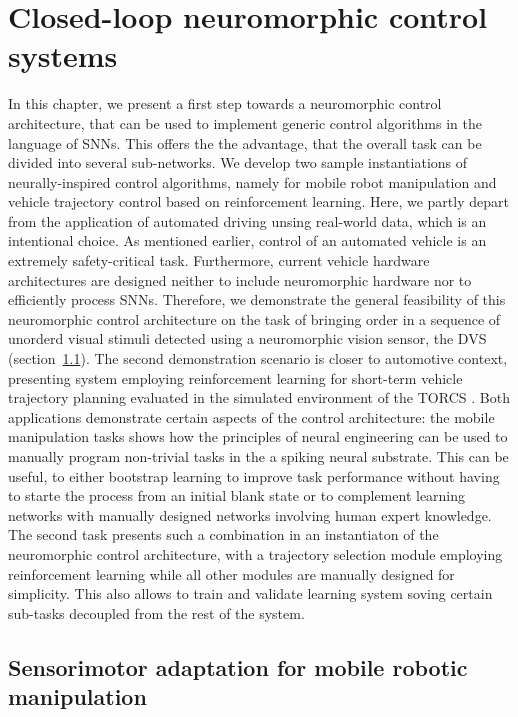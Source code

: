 \chapter{Closed-loop neuromorphic control systems}%
\label{chap:closed_loop_neuromorphic_control_systems}
In this chapter, we present a first step towards a neuromorphic control architecture, that can be used to implement generic control algorithms in the language of \acp{SNN}.
This offers the the advantage, that the overall task can be divided into several sub-networks.
We develop two sample instantiations of neurally-inspired control algorithms, namely for mobile robot manipulation and vehicle trajectory control based on reinforcement learning.
Here, we partly depart from the application of automated driving unsing real-world data, which is an intentional choice.
As mentioned earlier, control of an automated vehicle is an extremely safety-critical task.
Furthermore, current vehicle hardware architectures are designed neither to include neuromorphic hardware nor to efficiently process \acp{SNN}.
Therefore, we demonstrate the general feasibility of this neuromorphic control architecture on the task of bringing order in a sequence of unorderd visual stimuli detected using a neuromorphic vision sensor, the \ac{DVS} (section~\ref{sec:sensorimotor_adaptation_for_mobile_robotic_manipulation}). 
The second demonstration scenario is closer to automotive context, presenting system employing reinforcement learning for short-term vehicle trajectory planning evaluated in the simulated environment of the \acf{TORCS} \cite{TORCS}.
Both applications demonstrate certain aspects of the control architecture: the mobile manipulation tasks shows how the principles of neural engineering can be used to manually program non-trivial tasks in the a spiking neural substrate.
This can be useful, to either bootstrap learning to improve task performance without having to starte the process from an initial blank state or to complement learning networks with manually designed networks involving human expert knowledge.
The second task presents such a combination in an instantiaton of the neuromorphic control architecture, with a trajectory selection module employing reinforcement learning while all other modules are manually designed for simplicity.
This also allows to train and validate learning system soving certain sub-tasks decoupled from the rest of the system.


\section{Sensorimotor adaptation for mobile robotic manipulation}%
\label{sec:sensorimotor_adaptation_for_mobile_robotic_manipulation}

